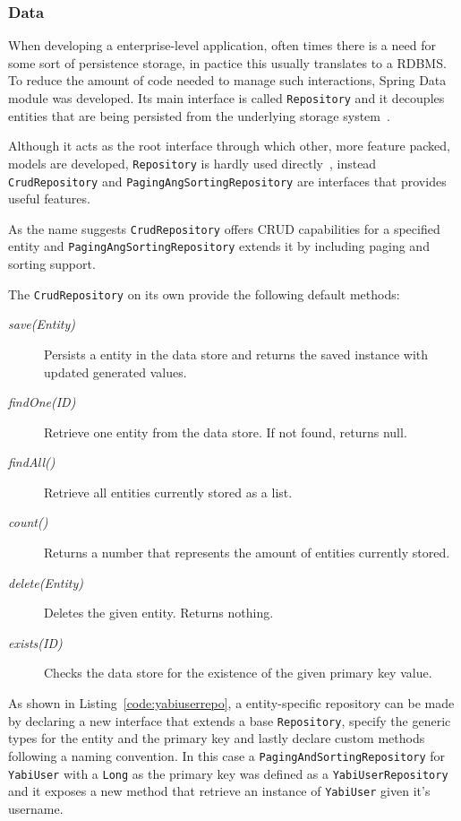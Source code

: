 \subsubsection{Data}
When developing a enterprise-level application, often times there is a need for some sort of persistence storage, in pactice this usually translates to a \gls{RDBMS}. To reduce the amount of code needed to manage such interactions, Spring Data module was developed. Its main interface is called \texttt{Repository} and it decouples entities that are being persisted from the underlying storage system~\cite{springdata}.

Although it acts as the root interface through which other, more feature packed, models are developed, \texttt{Repository} is hardly used directly~\cite{springdatadoc}, instead \texttt{CrudRepository} and \texttt{PagingAngSortingRepository} are interfaces that provides useful features.

As the name suggests \texttt{CrudRepository} offers \gls{CRUD} capabilities for a specified entity and \texttt{PagingAngSortingRepository} extends it by including paging and sorting support.

The \texttt{CrudRepository} on its own provide the following default methods:
\begin{description}
\item[\textit{save(Entity)}] Persists a entity in the data store and returns the saved instance with updated generated values.
\item[\textit{findOne(ID)}] Retrieve one entity from the data store. If not found, returns null.
\item[\textit{findAll()}] Retrieve all entities currently stored as a list.
\item[\textit{count()}] Returns a number that represents the amount of entities currently stored.
\item[\textit{delete(Entity)}] Deletes the given entity. Returns nothing.
\item[\textit{exists(ID)}] Checks the data store for the existence of the given primary key value.
\end{description}

As shown in Listing~\ref{code:yabiuserrepo}, a entity-specific repository can be made by declaring a new interface that extends a base \texttt{Repository}, specify the generic types for the entity and the primary key and lastly declare custom methods following a naming convention. In this case a \texttt{PagingAndSortingRepository} for \texttt{YabiUser} with a \texttt{Long} as the primary key was defined as a \texttt{YabiUserRepository} and it exposes a new method that retrieve an instance of \texttt{YabiUser} given it's username.

